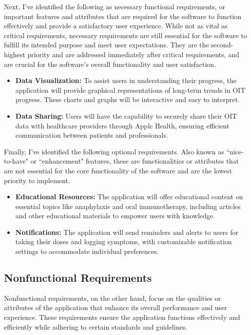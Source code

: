 Next, I've identified the following as necessary functional requirements, or important features and attributes that are required for the software to function effectively and provide a satisfactory user experience. While not as vital as critical requirements, necessary requirements are still essential for the software to fulfill its intended purpose and meet user expectations.
They are the second-highest priority and are addressed immediately after critical requirements, and are crucial for the software's overall functionality and user satisfaction.

\begin{itemize}
    \item \textbf{Data Visualization:} To assist users in understanding their progress, the application will provide graphical representations of long-term trends in OIT progress. These charts and graphs will be interactive and easy to interpret.
    \item \textbf{Data Sharing:} Users will have the capability to securely share their OIT data with healthcare providers through Apple Health, ensuring efficient communication between patients and professionals.
\end{itemize}

Finally, I've identified the following optional requirements. Also known as ``nice-to-have" or ``enhancement" features, these are functionalities or attributes that are not essential for the core functionality of the software and are the lowest priority to implement.

\begin{itemize}
    \item \textbf{Educational Resources:} The application will offer educational content on essential topics like anaphylaxis and oral immunotherapy, including articles and other educational materials to empower users with knowledge.
    \item \textbf{Notifications:} The application will send reminders and alerts to users for taking their doses and logging symptoms, with customizable notification settings to accommodate individual preferences.
\end{itemize}

\subsection{Nonfunctional Requirements}

Nonfunctional requirements, on the other hand, focus on the qualities or attributes of the application that enhance its overall performance and user experience. These requirements ensure the application functions effectively and efficiently while adhering to certain standards and guidelines. 

